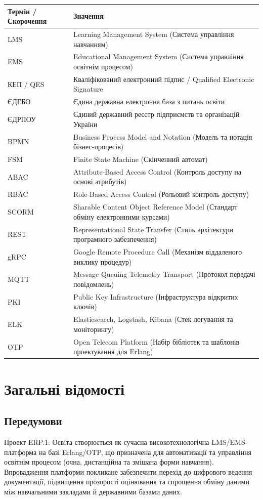 \documentclass{article}
\begin{document}
\begin{longtable}{p{4cm}p{10cm}}
\toprule
\textbf{Термін / Скорочення} & \textbf{Значення} \\
\midrule
LMS & Learning Management System (Система управління навчанням) \\
EMS & Educational Management System (Система управління освітнім процесом) \\
КЕП / QES & Кваліфікований електронний підпис / Qualified Electronic Signature \\
ЄДЕБО & Єдина державна електронна база з питань освіти \\
ЄДРПОУ & Єдиний державний реєстр підприємств та організацій України \\
BPMN & Business Process Model and Notation (Модель та нотація бізнес-процесів) \\
FSM & Finite State Machine (Скінченний автомат) \\
ABAC & Attribute-Based Access Control (Контроль доступу на основі атрибутів) \\
RBAC & Role-Based Access Control (Рольовий контроль доступу) \\
SCORM & Sharable Content Object Reference Model (Стандарт обміну електронними курсами) \\
REST & Representational State Transfer (Стиль архітектури програмного забезпечення) \\
gRPC & Google Remote Procedure Call (Механізм віддаленого виклику процедур) \\
MQTT & Message Queuing Telemetry Transport (Протокол передачі повідомлень) \\
PKI & Public Key Infrastructure (Інфраструктура відкритих ключів) \\
ELK & Elasticsearch, Logstash, Kibana (Стек логування та моніторингу) \\
OTP & Open Telecom Platform (Набір бібліотек та шаблонів проектування для Erlang) \\
\bottomrule
\end{longtable}

\newpage
\section{Загальні відомості}

\subsection{Передумови}
Проект ERP.1: Освіта створюється як сучасна високотехнологічна LMS/EMS-платформа на базі Erlang/OTP, що призначена для автоматизації та управління освітнім процесом (очна, дистанційна та змішана форми навчання). Впровадження платформи покликане забезпечити перехід до цифрового ведення документації, підвищення прозорості оцінювання та спрощення обміну даними між навчальними закладами й державними базами даних.
\end{document}
